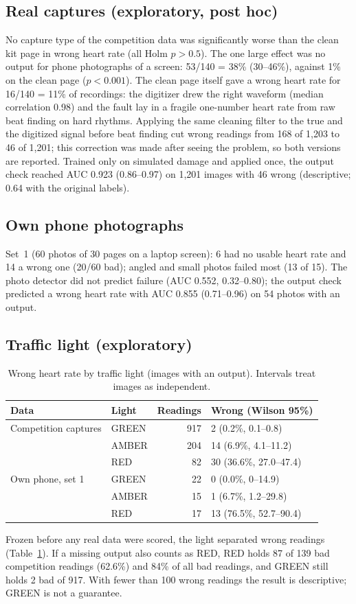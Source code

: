 \documentclass[11pt,a4paper]{article}
\begin{document}
\subsection{Real captures (exploratory, post hoc)}
No capture type of the competition data was significantly worse than the clean kit page in wrong heart rate (all Holm $p>0.5$). The one large effect was no output for phone photographs of a screen: 53/140 = 38\% (30--46\%), against 1\% on the clean page ($p<0.001$). The clean page itself gave a wrong heart rate for 16/140 = 11\% of recordings: the digitizer drew the right waveform (median correlation 0.98) and the fault lay in a fragile one-number heart rate from raw beat finding on hard rhythms. Applying the same cleaning filter to the true and the digitized signal before beat finding cut wrong readings from 168 of 1,203 to 46 of 1,201; this correction was made after seeing the problem, so both versions are reported. Trained only on simulated damage and applied once, the output check reached AUC 0.923 (0.86--0.97) on 1,201 images with 46 wrong (descriptive; 0.64 with the original labels).

\subsection{Own phone photographs}
Set~1 (60 photos of 30 pages on a laptop screen): 6 had no usable heart rate and 14 a wrong one (20/60 bad); angled and small photos failed most (13 of 15). The photo detector did not predict failure (AUC 0.552, 0.32--0.80); the output check predicted a wrong heart rate with AUC 0.855 (0.71--0.96) on 54 photos with an output.

\subsection{Traffic light (exploratory)}
\begin{table}[ht]
\caption{Wrong heart rate by traffic light (images with an output). Intervals treat images as independent.}
\label{tab:light}
\centering\small
\begin{tabular}{llrl}
\toprule
Data & Light & Readings & Wrong (Wilson 95\%) \\
\midrule
Competition captures & GREEN & 917 & 2 (0.2\%, 0.1--0.8) \\
 & AMBER & 204 & 14 (6.9\%, 4.1--11.2) \\
 & RED & 82 & 30 (36.6\%, 27.0--47.4) \\
Own phone, set 1 & GREEN & 22 & 0 (0.0\%, 0--14.9) \\
 & AMBER & 15 & 1 (6.7\%, 1.2--29.8) \\
 & RED & 17 & 13 (76.5\%, 52.7--90.4) \\
\bottomrule
\end{tabular}
\end{table}
Frozen before any real data were scored, the light separated wrong readings (Table~\ref{tab:light}). If a missing output also counts as RED, RED holds 87 of 139 bad competition readings (62.6\%) and 84\% of all bad readings, and GREEN still holds 2 bad of 917. With fewer than 100 wrong readings the result is descriptive; GREEN is not a guarantee.
\end{document}
